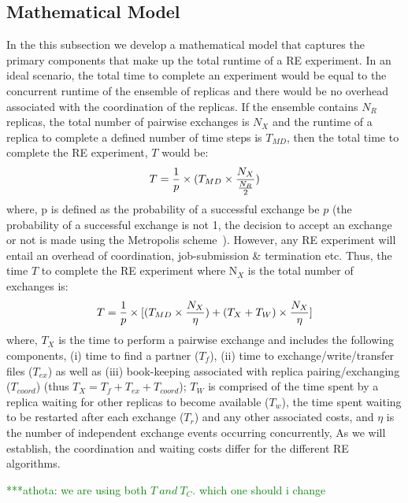 \documentclass{rspublic}
\newcommand{\alnote}[1]{ {\textcolor{blue} { ***andre: #1 }}}
\newcommand{\athotanote}[1]{ {\textcolor{green} { ***athota: #1 }}}
\newcommand{\alnote}[1]{}
\newcommand{\athotanote}[1]{}
\begin{document}
\subsection{Mathematical Model}
\label{sec:math-model}
In the this subsection we develop a mathematical model that captures
the primary components that make up the total runtime of a RE
experiment. In an ideal scenario, the total time to complete an
experiment would be equal to the concurrent runtime of the ensemble of
replicas and there would be no overhead associated with the
coordination of the replicas.  If the ensemble contains $N_R$
replicas, the total number of pairwise exchanges is $N_X$ and the
runtime of a replica to complete a defined number of time steps is
$T_{MD}$, then the total time to complete the RE experiment, $T$ would
be:
\begin{eqnarray}
T = {1\over p} \times (T_{MD} \times  {N_X \over {N_R \over 2}}) 
\label{eq:totaltime}
\end{eqnarray}
where, p is defined as the probability of a successful exchange be $p$
(the probability of a successful exchange is not 1, the
decision to accept an exchange or not is made using the
Metropolis scheme~\citep{metropolis:1087}). However, any RE experiment will entail an overhead
of coordination, job-submission \& termination etc. Thus, the time $T$
to complete the RE experiment where N$_X$ is the total number of
exchanges is:
\begin{eqnarray}
  T = {1\over p} \times [(T_{MD} \times  {N_X \over {\eta}}) +
  {(T_{X} + T_{W})} \times {N_X \over \eta}]
\label{eq:totaltime}
\end{eqnarray}
where, $T_{X}$ is the time to perform a pairwise exchange and includes
the following components, (i) time to find a partner ($T_f$), (ii)
time to exchange/write/transfer files ($T_{ex}$) as well as (iii)
book-keeping associated with replica pairing/exchanging ($T_{coord}$)
(thus $T_{X} = T_{f} + T_{ex}+T_{coord}$); 
$T_W$ is comprised of the time spent by a replica waiting for other
replicas to become available ($T_w$), the time spent waiting to be restarted
after each exchange ($T_r$) and any other associated costs, and $\eta$
is the number of independent exchange events occurring concurrently,
As we will establish, the coordination and waiting costs differ for
the different RE algorithms.

\athotanote{we are using both $T ~and ~T_C$. which one should i change}
\end{document}
